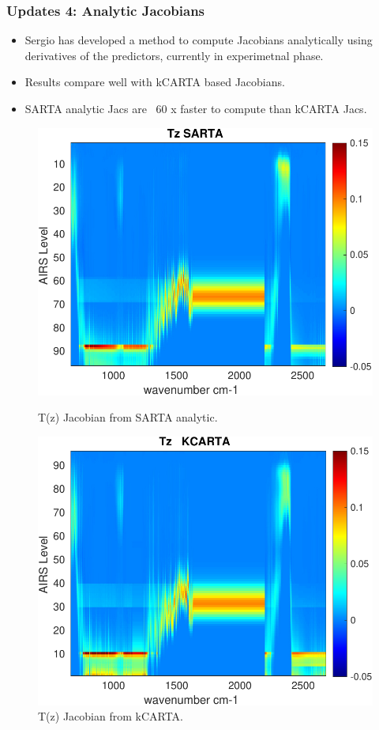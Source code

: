 \documentclass[10pt,t]{beamer}
\begin{document}
\begin{frame}
  \frametitle{Updates 4: Analytic Jacobians}
  \begin{itemize}
  \item Sergio has developed a method to compute Jacobians analytically using derivatives
    of the predictors, currently in experimetnal phase.
  \item Results compare well with kCARTA based Jacobians.
  \item SARTA analytic Jacs are ~60 x faster to compute than kCARTA Jacs. 
  \end{itemize}

\begin{figure}
\begin{minipage}[c]{0.45\linewidth}
  \includegraphics[width=\linewidth]{./Figs/jac_tz_sarta.pdf}
  \caption{T(z) Jacobian from SARTA analytic.}
\end{minipage}
\hfill
\begin{minipage}[c]{0.45\linewidth}
  \includegraphics[width=\linewidth]{./Figs/jac_tz_kcarta.pdf}
  \caption{T(z) Jacobian from kCARTA.}
\end{minipage}%
\end{figure}


\end{frame}
\end{document}

